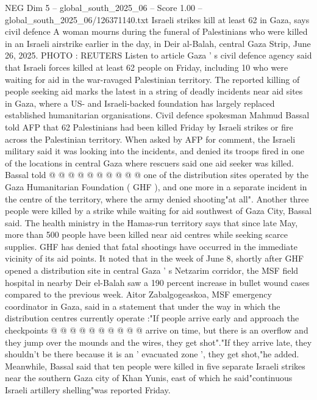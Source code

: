 \begin{textsample}{NEG Dim 5 – global\_south\_2025\_06 – Score 1.00 – global\_south\_2025\_06/126371140.txt}  \label{ex:f5_neg_419}
Israeli strikes kill at least 62 in Gaza, says civil defence A woman mourns during the funeral of Palestinians who were killed in an Israeli airstrike earlier in the day, in Deir al-Balah, central Gaza Strip, June 26, 2025.
PHOTO : REUTERS Listen to article Gaza ' s civil defence agency said that Israeli forces killed at least 62 people on Friday, including 10 who were waiting for aid in the war-ravaged Palestinian territory.
The reported killing of people seeking aid marks the latest in a string of deadly incidents near aid sites in Gaza, where a US- and Israeli-backed foundation has largely replaced established humanitarian organisations.
Civil defence spokesman Mahmud Bassal told AFP that 62 Palestinians had been killed Friday by Israeli strikes or fire across the Palestinian territory.
When asked by AFP for comment, the Israeli military said it was looking into the incidents, and denied its troops fired in one of the locations in central Gaza where rescuers said one aid seeker was killed.
Bassal told @ @ @ @ @ @ @ @ @ @ one of the distribution sites operated by the Gaza Humanitarian Foundation ( GHF ), and one more in a separate incident in the centre of the territory, where the army denied shooting"at all".
Another three people were killed by a strike while waiting for aid southwest of Gaza City, Bassal said.
The health ministry in the Hamas-run territory says that since late May, more than 500 people have been killed near aid centres while seeking scarce supplies.
GHF has denied that fatal shootings have occurred in the immediate vicinity of its aid points.
It noted that in the week of June 8, shortly after GHF opened a distribution site in central Gaza ' s Netzarim corridor, the MSF field hospital in nearby Deir el-Balah saw a 190 percent increase in bullet wound cases compared to the previous week.
Aitor Zabalgogeaskoa, MSF emergency coordinator in Gaza, said in a statement that under the way in which the distribution centres currently operate :"If people arrive early and approach the checkpoints @ @ @ @ @ @ @ @ @ @ arrive on time, but there is an overflow and they jump over the mounds and the wires, they get shot"."If they arrive late, they shouldn't be there because it is an ' evacuated zone ', they get shot,"he added.
Meanwhile, Bassal said that ten people were killed in five separate Israeli strikes near the southern Gaza city of Khan Yunis, east of which he said"continuous Israeli artillery shelling"was reported Friday.

\end{textsample}
